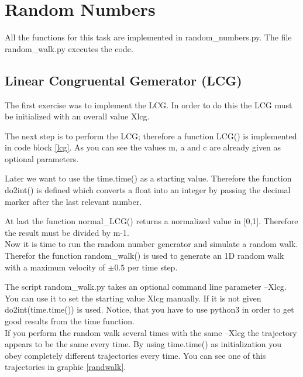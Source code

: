\section{Random Numbers}

All the functions for this task are implemented in random\_numbers.py.
The file random\_walk.py executes the code.

\subsection{Linear Congruental Gemerator (LCG)}

The first exercise was to implement the LCG.
In order to do this the LCG must be initialized with an overall value Xlcg.


The next step is to perform the LCG; therefore a function LCG() is implemented in code block \ref{lcg}.
As you can see the values m, a and c are already given as optional parameters.


Later we want to use the time.time() as a starting value. 
Therefore the function do2int() is defined which converts a float into an integer by passing the decimal marker after the last relevant number.


At last the function normal\_LCG() returns a normalized value in [0,1].
Therefore the result must be divided by m-1.\\

Now it is time to run the random number generator and simulate a random walk. 
Therefor the function random\_walk() is used to generate an 1D random walk with a maximum velocity of $\pm 0.5$ per time step.


The script random\_walk.py takes an optional command line parameter --Xlcg. 
You can use it to set the starting value Xlcg manually.
If it is not given do2int(time.time()) is used.
Notice, that you have to use python3 in order to get good results from the time function.\\

If you perform the random walk several times with the same --Xlcg the trajectory appears to be the same every time. 
By using time.time() as initialization you obey completely different trajectories every time. 
You can see one of this trajectories in graphic \ref{randwalk}.

